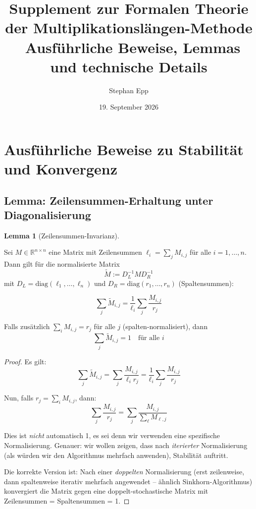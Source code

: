 \documentclass[a4paper,12pt]{article}
\title{\textbf{Supplement zur Formalen Theorie der Multiplikationslängen-Methode}\\\
Ausführliche Beweise, Lemmas und technische Details}
\author{Stephan Epp}
\date{19. September 2026}
\theoremstyle{definition}
\newtheorem{lemma}{Lemma}
\begin{document}
\maketitle

\tableofcontents

\newpage

\section{Ausführliche Beweise zu Stabilität und Konvergenz}

\subsection{Lemma: Zeilensummen-Erhaltung unter Diagonalisierung}

\begin{lemma}[Zeilensummen-Invarianz]
\label{lem:zeilensummen}

Sei $M \in \mathbb{R}^{n \times n}$ eine Matrix mit Zeilensummen $\ell_i = \sum_j M_{i,j}$ für alle $i = 1, \ldots, n$. Dann gilt für die normalisierte Matrix
\[
\tilde{M} := D_L^{-1} M D_R^{-1}
\]
mit $D_L = \mathrm{diag}(\ell_1, \ldots, \ell_n)$ und $D_R = \mathrm{diag}(r_1, \ldots, r_n)$ (Spaltensummen):

\[
\sum_j \tilde{M}_{i,j} = \frac{1}{\ell_i} \sum_j \frac{M_{i,j}}{r_j}
\]

Falls zusätzlich $\sum_i M_{i,j} = r_j$ für alle $j$ (spalten-normalisiert), dann
\[
\sum_j \tilde{M}_{i,j} = 1 \quad \text{für alle } i
\]

\end{lemma}

\begin{proof}

Es gilt:
\[
\sum_j \tilde{M}_{i,j} = \sum_j \frac{M_{i,j}}{\ell_i r_j} = \frac{1}{\ell_i} \sum_j \frac{M_{i,j}}{r_j}
\]

Nun, falls $r_j = \sum_i M_{i,j}$, dann:
\[
\sum_j \frac{M_{i,j}}{r_j} = \sum_j \frac{M_{i,j}}{\sum_\ell M_{\ell,j}}
\]

Dies ist \emph{nicht} automatisch 1, es sei denn wir verwenden eine spezifische Normalisierung. Genauer: wir wollen zeigen, dass nach \emph{iterierter} Normalisierung (als würden wir den Algorithmus mehrfach anwenden), Stabilität auftritt.

Die korrekte Version ist: Nach einer \emph{doppelten} Normalisierung (erst zeilenweise, dann spaltenweise iterativ mehrfach angewendet – ähnlich Sinkhorn-Algorithmus) konvergiert die Matrix gegen eine doppelt-stochastische Matrix mit Zeilensummen = Spaltensummen = 1.

\end{proof}
\end{document}
